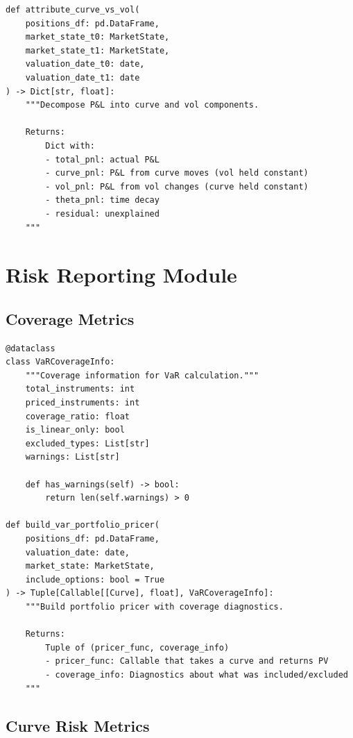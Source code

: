 \documentclass[12pt,a4paper]{report}
\begin{document}
\begin{lstlisting}
def attribute_curve_vs_vol(
    positions_df: pd.DataFrame,
    market_state_t0: MarketState,
    market_state_t1: MarketState,
    valuation_date_t0: date,
    valuation_date_t1: date
) -> Dict[str, float]:
    """Decompose P&L into curve and vol components.
    
    Returns:
        Dict with:
        - total_pnl: actual P&L
        - curve_pnl: P&L from curve moves (vol held constant)
        - vol_pnl: P&L from vol changes (curve held constant)
        - theta_pnl: time decay
        - residual: unexplained
    """
\end{lstlisting}

\section{Risk Reporting Module}

\subsection{Coverage Metrics}

\begin{lstlisting}
@dataclass
class VaRCoverageInfo:
    """Coverage information for VaR calculation."""
    total_instruments: int
    priced_instruments: int
    coverage_ratio: float
    is_linear_only: bool
    excluded_types: List[str]
    warnings: List[str]
    
    def has_warnings(self) -> bool:
        return len(self.warnings) > 0

def build_var_portfolio_pricer(
    positions_df: pd.DataFrame,
    valuation_date: date,
    market_state: MarketState,
    include_options: bool = True
) -> Tuple[Callable[[Curve], float], VaRCoverageInfo]:
    """Build portfolio pricer with coverage diagnostics.
    
    Returns:
        Tuple of (pricer_func, coverage_info)
        - pricer_func: Callable that takes a curve and returns PV
        - coverage_info: Diagnostics about what was included/excluded
    """
\end{lstlisting}

\subsection{Curve Risk Metrics}
\end{document}
